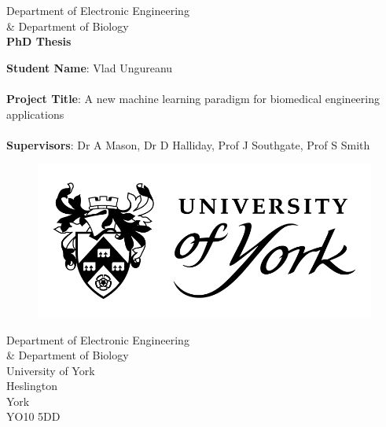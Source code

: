 \begin{titlepage} 
  \begin{center} 
    
    	\large Department of Electronic Engineering \\ \& Department of Biology \\
        \vspace{1.2cm}
		\Huge \textbf{PhD Thesis} \\
        \vspace{1.2cm}
            
       \begin{flushleft}
        \large \textbf{Student Name}: Vlad Ungureanu \\~\\
        \large \textbf{Project Title}: A new machine learning paradigm for
        biomedical engineering applications\\~\\
        \large \textbf{Supervisors}: Dr A Mason, Dr D Halliday, Prof J Southgate, Prof S Smith
 
       \end{flushleft} 
            
           \begin{figure}[t]
          	\includegraphics[scale=0.5]{Images/Resources/UOY_logo}
          \end{figure}
    \vspace{1.2cm}
    \small Department of Electronic Engineering \\ \& Department of Biology \\
    \small University of York \\
    \small Heslington \\
    \small York \\
    \small YO10 5DD\\
                  
 \end{center} 

\end{titlepage}
